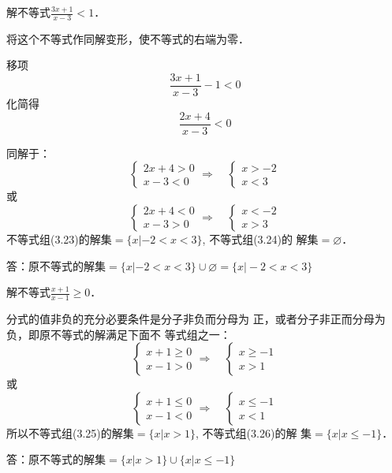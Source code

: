 \begin{example}
    解不等式$\frac{3x+1}{x-3}<1$．
\end{example}

\begin{solution}
    将这个不等式作同解变形，使不等式的右端为零．

    移项$$\frac{3x+1}{x-3}-1<0$$
化简得$$\frac{2x+4}{x-3}<0$$

同解于：
\begin{equation}
    \begin{cases}
        2x+4>0\\x-3<0
    \end{cases}\Rightarrow\quad \begin{cases}
        x>-2\\  x<3
    \end{cases}
\end{equation}
或
\begin{equation}
    \begin{cases}
        2x+4<0\\x-3>0
    \end{cases}\Rightarrow\quad \begin{cases}
        x<-2\\  x>3
    \end{cases}
\end{equation}
不等式组(3.23)的解集$=\{x|-2<x<3\}$, 不等式组(3.24)的
解集$=\varnothing$．

答：原不等式的解集$=\{x|-2<x<3\}\cup\varnothing=\{x|-2<x<3\}$

\end{solution}

\begin{example}
    解不等式$\frac{x+1}{x-1}\ge 0$．
\end{example}

\begin{solution}
分式的值非负的充分必要条件是分子非负而分母为
正，或者分子非正而分母为负，即原不等式的解满足下面不
等式组之一：
\begin{equation}
    \begin{cases}
        x+1\ge 0\\x-1>0
    \end{cases}\Rightarrow\quad \begin{cases}
        x\ge -1\\  x>1
    \end{cases}
\end{equation}
或
\begin{equation}
    \begin{cases}
        x+1\le 0\\x-1<0
    \end{cases}\Rightarrow\quad \begin{cases}
        x\le -1\\  x<1
    \end{cases}
\end{equation}
所以不等式组(3.25)的解集$=\{x|x>1\}$, 不等式组(3.26)的解
集$=\{x|x\le -1\}$．

答：原不等式的解集$=\{x|x>1\}\cup\{x|x\le -1\}$
\end{solution}


